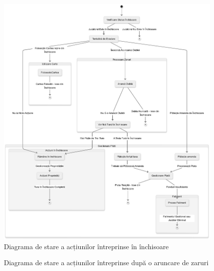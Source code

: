 \begin{figure}[p]
    \centering
    \includegraphics[width=14cm]{images/turn_state_diagram_jail_handler.png}
    \caption{Diagrama de stare a acțiunilor întreprinse în închisoare}
    \label{fig:turn_state_diagram_overviewl}

    \begin{minipage}{.1cm}
        \vfill
    \end{minipage}
\end{figure}

\begin{figure}[H]
    \centering
    \caption{Diagrama de stare a acțiunilor întreprinse după o aruncare de zaruri}
    \label{fig:turn_state_diagram_overviewl}
\end{figure}


